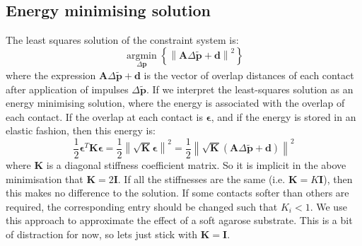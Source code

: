 \documentclass{report}
\renewcommand{\vec}[1]{\mathbf{#1}}
\newcommand{\mat}{\mathbf}
\newcommand{\deltap}{\Delta \vec{p}}
\begin{document}
\subsection{Energy minimising solution}
The least squares solution of the constraint system is:
\[\underset{\deltap}{\operatorname{argmin}}
\left\{
\left\|\mat{A}\Delta\tilde{\vec{p}} + \vec{d}\right\|^2 \right\} \]
where the expression $\mat{A}\Delta\tilde{\vec{p}} + \vec{d}$ is the vector of overlap
distances of each contact after application of impulses $\Delta \tilde{\vec{p}}$. If we interpret the least-squares
solution as an energy minimising solution, where the energy is
associated with the overlap of each contact. If the overlap at each
contact is $\vec{\epsilon}$, and if the energy is stored in an elastic
fashion, then this energy is:
\[\frac{1}{2}\vec{\epsilon}^T \mat{K} \vec{\epsilon}
 =  \frac{1}{2}\left\| \sqrt{\mat{K}}\vec{\epsilon} \right\|^2
 = \frac{1}{2}\left\| \sqrt{\mat{K}}\left(\mat{A}\Delta\tilde{\vec{p}} + \vec{d}\right) \right\|^2 \]
 where $\mat{K}$ is a diagonal stiffness coefficient matrix. So
it is implicit in the above minimisation that $\mat{K}=2\mat{I}$. If
all the stiffnesses are the same (i.e. $\mat{K} = K\mat{I}$), then
this makes no difference to the solution.  If some
contacts softer than others are required, the corresponding entry should be changed such that
$K_i<1$. We use this approach to approximate the 
effect of a soft agarose substrate. This is a bit of distraction for now, so
lets just stick with $\mat{K}=\mat{I}$.
\end{document}
